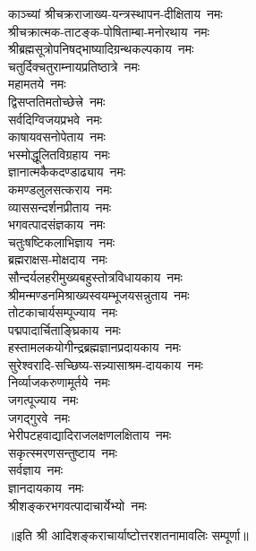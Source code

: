 \begin{multicols}{2}
\begin{flushleft}
काञ्च्यां श्रीचक्रराजाख्य-यन्त्रस्थापन-दीक्षिताय~नमः\\
श्रीचक्रात्मक-ताटङ्क-पोषिताम्बा-मनोरथाय~नमः\\
श्रीब्रह्मसूत्रोपनिषद्\-भाष्यादि\-ग्रन्थ\-कल्पकाय~नमः\\
चतुर्दिक्चतुराम्नाय\-प्रतिष्ठात्रे~नमः\\
महामतये~नमः\\
द्विसप्ततिमतोच्छेत्त्रे~नमः\\
सर्वदिग्विजयप्रभवे~नमः\\
काषायवसनोपेताय~नमः\\
भस्मोद्धूलितविग्रहाय~नमः\\
ज्ञानात्मकैकदण्डाढ्याय~नमः\hfill{}\\
        
कमण्डलुलसत्कराय~नमः\\
व्याससन्दर्शनप्रीताय~नमः\\
भगवत्पादसंज्ञकाय~नमः\\
चतुःषष्टिकलाभिज्ञाय~नमः\\
ब्रह्मराक्षस-मोक्षदाय~नमः\\
सौन्दर्यलहरी\-मुख्य\-बहु\-स्तोत्र\-विधाय\-काय~नमः\\
श्रीमन्मण्डन\-मिश्राख्य\-स्वयम्भू\-जय\-सन्नुताय~नमः\\
तोटकाचार्यसम्पूज्याय~नमः\\
पद्मपादार्चिताङ्घ्रिकाय~नमः\\
हस्तामलक\-योगीन्द्र\-ब्रह्म\-ज्ञान\-प्रदायकाय~नमः\hfill{}\\

सुरेश्वरादि-सच्छिष्य-सन्न्यासाश्रम-दायकाय~नमः\\
निर्व्याजकरुणामूर्तये~नमः\\
जगत्पूज्याय~नमः\\
जगद्गुरवे~नमः\\
भेरी\-पटह\-वाद्यादि\-राजलक्षण\-लक्षिताय~नमः\\
सकृत्स्मरणसन्तुष्टाय~नमः\\
सर्वज्ञाय~नमः\\
ज्ञानदायकाय~नमः\hfill{}\\
श्रीशङ्करभगवत्\-पादाचार्येभ्यो~नमः\\
                                                                                
    \end{flushleft}
\end{multicols}
॥इति श्री आदिशङ्कराचार्याष्टोत्तरशतनामावलिः  सम्पूर्णा॥
